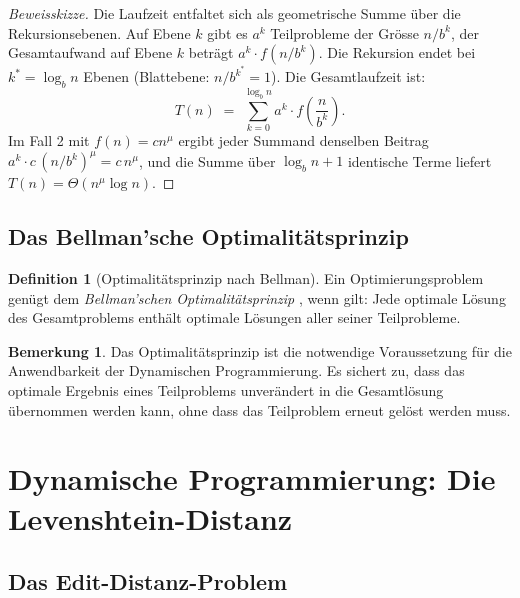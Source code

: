 ﻿\documentclass[a4paper,12pt]{article}
\theoremstyle{definition}
\newtheorem{definition}{Definition}
\newtheorem{bemerkung}{Bemerkung}
\begin{document}
\begin{proof}[Beweisskizze]
    Die Laufzeit entfaltet sich als geometrische Summe über die Rekursionsebenen.
    Auf Ebene $k$ gibt es $a^k$ Teilprobleme der Grösse $n/b^k$, der Gesamtaufwand
    auf Ebene $k$ beträgt $a^k \cdot f(n/b^k)$. Die Rekursion endet bei
    $k^* = \log_b n$ Ebenen (Blattebene: $n/b^{k^*} = 1$). Die Gesamtlaufzeit ist:
    \[
        T(n) \;=\; \sum_{k=0}^{\log_b n} a^k \cdot f\!\left(\frac{n}{b^k}\right).
    \]
    Im Fall 2 mit $f(n) = cn^\mu$ ergibt jeder Summand denselben Beitrag
    $a^k \cdot c\,(n/b^k)^\mu = c\,n^\mu$, und die Summe über $\log_b n + 1$
    identische Terme liefert $T(n) = \Theta(n^\mu \log n)$. \qedhere
\end{proof}

\subsection{Das Bellman'sche Optimalitätsprinzip}

\begin{definition}[Optimalitätsprinzip nach Bellman]
    Ein Optimierungsproblem genügt dem \emph{Bellman'schen Optimalitätsprinzip}
    \cite{bellman1957}, wenn gilt: Jede optimale Lösung des Gesamtproblems
    enthält optimale Lösungen aller seiner Teilprobleme.
\end{definition}

\begin{bemerkung}
    Das Optimalitätsprinzip ist die notwendige Voraussetzung für die Anwendbarkeit
    der Dynamischen Programmierung. Es sichert zu, dass das optimale Ergebnis eines
    Teilproblems unverändert in die Gesamtlösung übernommen werden kann, ohne dass
    das Teilproblem erneut gelöst werden muss.
\end{bemerkung}

\section{Dynamische Programmierung: Die Levenshtein-Distanz}

\subsection{Das Edit-Distanz-Problem}
\end{document}
